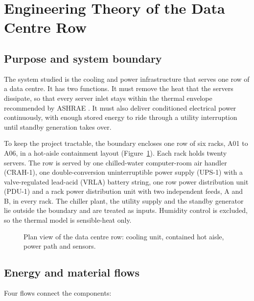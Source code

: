 \section{Engineering Theory of the Data Centre Row}
\label{sec:engineering}

\subsection{Purpose and system boundary}

The system studied is the cooling and power infrastructure that serves one row of a data centre. It has two functions. It must remove the heat that the servers dissipate, so that every server inlet stays within the thermal envelope recommended by ASHRAE \parencite{ashrae2021}. It must also deliver conditioned electrical power continuously, with enough stored energy to ride through a utility interruption until standby generation takes over.

To keep the project tractable, the boundary encloses one row of six racks, A01 to A06, in a hot-aisle containment layout (Figure~\ref{fig:system}). Each rack holds twenty servers. The row is served by one chilled-water computer-room air handler (CRAH-1), one double-conversion uninterruptible power supply (UPS-1) with a valve-regulated lead-acid (VRLA) battery string, one row power distribution unit (PDU-1) and a rack power distribution unit with two independent feeds, A and B, in every rack. The chiller plant, the utility supply and the standby generator lie outside the boundary and are treated as inputs. Humidity control is excluded, so the thermal model is sensible-heat only.

\begin{figure}[htbp]
  \centering
  
  \caption{Plan view of the data centre row: cooling unit, contained hot aisle, power path and sensors.}
  \label{fig:system}
\end{figure}

\subsection{Energy and material flows}

Four flows connect the components:

